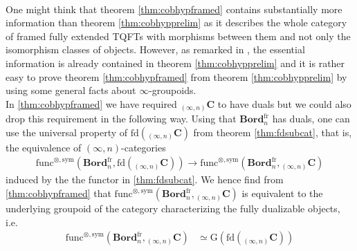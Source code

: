 \\
One might think that theorem \ref{thm:cobhypframed} contains substantially more information than theorem \ref{thm:cobhypprelim} as it describes the whole category of framed fully extended TQFTs with morphisms between them and not only the isomorphism classes of objects. However, as remarked in \cite{dfcdc48c}, the essential information is already contained in theorem \ref{thm:cobhypprelim} and it is rather easy to prove theorem \ref{thm:cobhypframed} from theorem \ref{thm:cobhypprelim} by using some general facts about $\infty$-groupoids.
\\
In \ref{thm:cobhypframed} we have required ${_{(\infty,n)}}\mathbf{C}$ to have duals but we could also drop this requirement in the following way. Using that $\mathbf{Bord}_{n}^{\mathrm{fr}}$ has duals, one can use the universal property of $\mathrm{fd}({_{(\infty,n)}}\mathbf{C})$ from theorem \ref{thm:fdsubcat}, that is, the equivalence of $(\infty,n)$-categories
\begin{align*}
  \mathrm{func}^{\otimes,\mathrm{sym}}
  \left(
    \mathbf{Bord}_{n}^{\mathrm{fr}}
    ,
    \mathrm{fd}
    \left(
      {_{(\infty,n)}}\mathbf{C}
    \right)
  \right)
  \to
  \mathrm{func}^{\otimes,\mathrm{sym}}
  \left(
    \mathbf{Bord}_{n}^{\mathrm{fr}}
    ,
    {_{(\infty,n)}}\mathbf{C}
  \right)
\end{align*}
induced by the the functor in \ref{thm:fdsubcat}. We hence find from \ref{thm:cobhypframed} that $\mathrm{func}^{\otimes,\mathrm{sym}}(\mathbf{Bord}_{n}^{\mathrm{fr}},{_{(\infty,n)}}\mathbf{C})$ is equivalent to the underlying groupoid of the category characterizing the fully dualizable objects, i.e.
\begin{align*}
  \mathrm{func}^{\otimes,\mathrm{sym}}
  \left(
    \mathbf{Bord}_{n}^{\mathrm{fr}}
    ,
    {_{(\infty,n)}}\mathbf{C}
  \right)
  &\simeq
  \mathrm{G}(\mathrm{fd}({_{(\infty,n)}}\mathbf{C}))
\end{align*}
